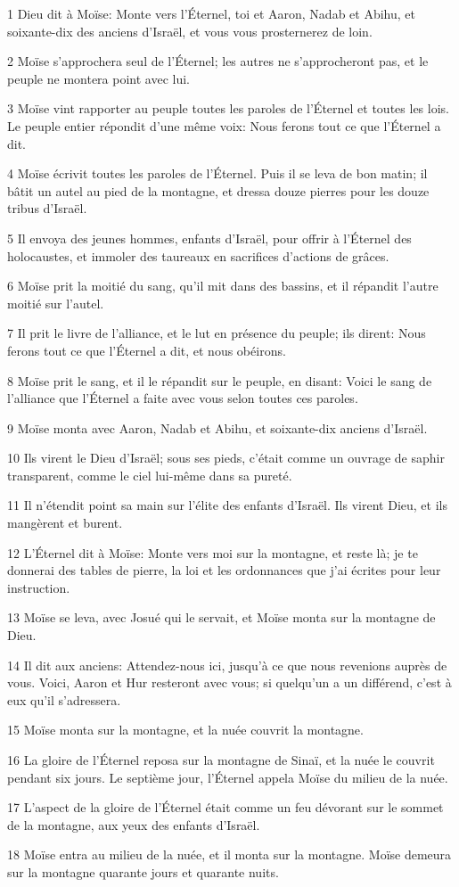 \par 1 Dieu dit à Moïse: Monte vers l'Éternel, toi et Aaron, Nadab et Abihu, et soixante-dix des anciens d'Israël, et vous vous prosternerez de loin.
\par 2 Moïse s'approchera seul de l'Éternel; les autres ne s'approcheront pas, et le peuple ne montera point avec lui.
\par 3 Moïse vint rapporter au peuple toutes les paroles de l'Éternel et toutes les lois. Le peuple entier répondit d'une même voix: Nous ferons tout ce que l'Éternel a dit.
\par 4 Moïse écrivit toutes les paroles de l'Éternel. Puis il se leva de bon matin; il bâtit un autel au pied de la montagne, et dressa douze pierres pour les douze tribus d'Israël.
\par 5 Il envoya des jeunes hommes, enfants d'Israël, pour offrir à l'Éternel des holocaustes, et immoler des taureaux en sacrifices d'actions de grâces.
\par 6 Moïse prit la moitié du sang, qu'il mit dans des bassins, et il répandit l'autre moitié sur l'autel.
\par 7 Il prit le livre de l'alliance, et le lut en présence du peuple; ils dirent: Nous ferons tout ce que l'Éternel a dit, et nous obéirons.
\par 8 Moïse prit le sang, et il le répandit sur le peuple, en disant: Voici le sang de l'alliance que l'Éternel a faite avec vous selon toutes ces paroles.
\par 9 Moïse monta avec Aaron, Nadab et Abihu, et soixante-dix anciens d'Israël.
\par 10 Ils virent le Dieu d'Israël; sous ses pieds, c'était comme un ouvrage de saphir transparent, comme le ciel lui-même dans sa pureté.
\par 11 Il n'étendit point sa main sur l'élite des enfants d'Israël. Ils virent Dieu, et ils mangèrent et burent.
\par 12 L'Éternel dit à Moïse: Monte vers moi sur la montagne, et reste là; je te donnerai des tables de pierre, la loi et les ordonnances que j'ai écrites pour leur instruction.
\par 13 Moïse se leva, avec Josué qui le servait, et Moïse monta sur la montagne de Dieu.
\par 14 Il dit aux anciens: Attendez-nous ici, jusqu'à ce que nous revenions auprès de vous. Voici, Aaron et Hur resteront avec vous; si quelqu'un a un différend, c'est à eux qu'il s'adressera.
\par 15 Moïse monta sur la montagne, et la nuée couvrit la montagne.
\par 16 La gloire de l'Éternel reposa sur la montagne de Sinaï, et la nuée le couvrit pendant six jours. Le septième jour, l'Éternel appela Moïse du milieu de la nuée.
\par 17 L'aspect de la gloire de l'Éternel était comme un feu dévorant sur le sommet de la montagne, aux yeux des enfants d'Israël.
\par 18 Moïse entra au milieu de la nuée, et il monta sur la montagne. Moïse demeura sur la montagne quarante jours et quarante nuits.

